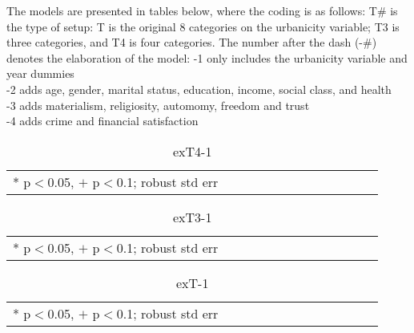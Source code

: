 \documentclass[10pt, letterpaper]{article}
\begin{document}
\begin{spacing}{1.4}
The models are presented in tables below, where the coding is as follows:
T\# is the type of setup: T is the original 8 categories on the urbanicity
variable; T3 is three categories, and T4 is four categories. 
The number after the dash (-\#) denotes the elaboration of the model:
-1 only includes the urbanicity variable and year dummies\\
-2 adds  age, gender, marital status,  education, income, social class, and health\\
-3 adds materialism, religiosity, automomy, freedom and trust\\
-4 adds crime and financial satisfaction


\begin{spacing}{.9} \begin{table}[H]\centering  \label{exT4-1} \begin{scriptsize} \begin{tabular}{p{1.8in}p{.5in}p{.5in}p{.5in}p{.5in}p{.5in}p{.5in}p{.5in}p{.5in}p{.5in}p{.5 in}p{.5in}p{.5 in}}\hline  \hline   * p$<$0.05, $+$ p$<$0.1; robust std err \end{tabular}\end{scriptsize}\caption{exT4-1}\end{table} \end{spacing}

\begin{spacing}{.9} \begin{table}[H]\centering  \label{exT3-1} \begin{scriptsize} \begin{tabular}{p{1.8in}p{.5in}p{.5in}p{.5in}p{.5in}p{.5in}p{.5in}p{.5in}p{.5in}p{.5in}p{.5 in}p{.5in}p{.5 in}}\hline  \hline   * p$<$0.05, $+$ p$<$0.1; robust std err \end{tabular}\end{scriptsize}\caption{exT3-1}\end{table} \end{spacing}

\begin{spacing}{.9} \begin{table}[H]\centering  \label{exT-1} \begin{scriptsize} \begin{tabular}{p{1.8in}p{.5in}p{.5in}p{.5in}p{.5in}p{.5in}p{.5in}p{.5in}p{.5in}p{.5in}p{.5 in}p{.5in}p{.5 in}}\hline  \hline   * p$<$0.05, $+$ p$<$0.1; robust std err \end{tabular}\end{scriptsize}\caption{exT-1}\end{table} \end{spacing}



\end{spacing}
\end{document}
